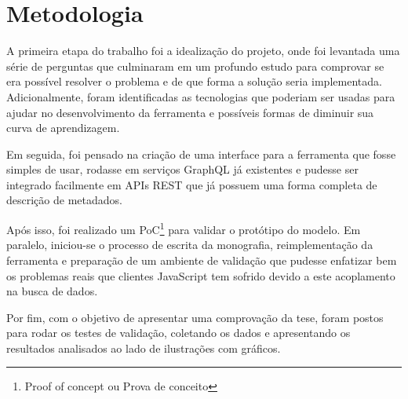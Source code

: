 \section[Metodologia]{Metodologia}

A primeira etapa do trabalho foi a idealização do projeto, onde foi levantada uma série de perguntas que culminaram em um profundo estudo para comprovar se era possível resolver o problema e de que forma a solução seria implementada. Adicionalmente, foram identificadas as tecnologias que poderiam ser usadas para ajudar no desenvolvimento da ferramenta e possíveis formas de diminuir sua curva de aprendizagem.

Em seguida, foi pensado na criação de uma interface para a ferramenta que fosse simples de usar, rodasse em serviços GraphQL já existentes e pudesse ser integrado facilmente em APIs REST que já possuem uma forma completa de descrição de metadados.

Após isso, foi realizado um PoC\footnote{
  Proof of concept ou Prova de conceito
} para validar o protótipo do modelo. Em paralelo, iniciou-se o processo de escrita da monografia, reimplementação da ferramenta e preparação de um ambiente de validação que pudesse enfatizar bem os problemas reais que clientes JavaScript tem sofrido devido a este acoplamento na busca de dados. 

Por fim, com o objetivo de apresentar uma comprovação da tese, foram postos para rodar os testes de validação, coletando os dados e apresentando os resultados analisados ao lado de ilustrações com gráficos.